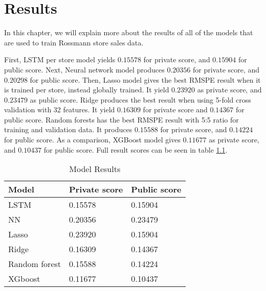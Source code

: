 \chapter{Results}
In this chapter, we will explain more about the results of all of the models that are used to train Rossmann store sales data. 

First, LSTM per store model yields $0.15578$ for private score, and $0.15904$ for public score. Next, Neural network model produces $0.20356$ for private score, and $0.20298$ for public score. Then, Lasso model gives the best RMSPE result when it is trained per store, instead globally trained. It yield $0.23920$ as private score, and $0.23479$ as public score. Ridge produces the best result when using 5-fold cross validation with 32 features. It yield $0.16309$ for private score and $0.14367$ for public score. Random forests has the best RMSPE result with 5:5 ratio for training and validation data. It produces $0.15588$ for private score, and $0.14224$ for public score. As a comparison, XGBoost model gives $0.11677$ as private score, and $0.10437$ for public score. Full result scores can be seen in table \ref{tab:result}.

\begin{table}[H]
	\centering
	\caption{Model Results}
	\label{tab:result}
	\begin{tabular}{|m{200pt}|m{100pt}|m{100pt}|}
		\hline
		Model & Private score & Public score \\ \hline
		LSTM & 0.15578 & 0.15904 \\ \hline
		NN & 0.20356 & 0.23479 \\ \hline
		Lasso & 0.23920 & 0.15904 \\ \hline
		Ridge & 0.16309 & 0.14367 \\ \hline
		Random forest & 0.15588 & 0.14224 \\ \hline
		XGboost & 0.11677 & 0.10437 \\ \hline
	\end{tabular}
\end{table}